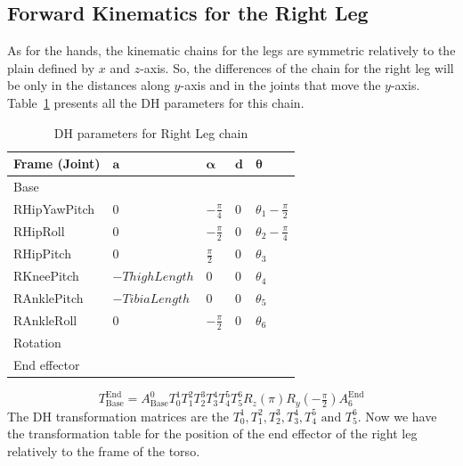 \subsection{Forward Kinematics for the Right Leg}
As for the hands, the kinematic chains for the legs are symmetric relatively to the plain defined by $x$ and $z$-axis. So, the differences of the chain for the right leg will be only in the distances along $y$-axis and in the joints that move the $y$-axis. Table~\ref{tab:DHrleg} presents all the DH parameters for this chain.
\begin{table}[!h]
\centering
\caption{DH parameters for Right Leg chain}
\begin{tabular}{|l|>{\centering\arraybackslash}m{2.55cm}|>{\centering\arraybackslash}m{2.55cm}|>{\centering\arraybackslash}m{2.55cm}|>{\centering\arraybackslash}m{2.55cm}|}
\hline
\textbf{Frame (Joint)} & $\mathbf{a}$ & $\boldsymbol{\alpha}$ & $\mathbf{d}$ & $\boldsymbol{\theta}$\\ \hline
Base & \multicolumn{4}{|c|}{$A(0,\text{\footnotesize{-HipOffsetY}},\text{\footnotesize{-HipOffsetZ}})$} \\ \hline
RHipYawPitch & $0$ & $-\frac{\pi}{4}$ & $0$ & $\theta_1 - \frac{\pi}{2}$ \\ \hline
RHipRoll & $0$ & $-\frac{\pi}{2}$ & $0$ & $\theta_2 - \frac{\pi}{4}$ \\ \hline
RHipPitch & $0$ & $\frac{\pi}{2}$ & $0$ & $\theta_3$ \\ \hline
RKneePitch & $-ThighLength$ & $0$ & $0$ & $\theta_4$ \\ \hline
RAnklePitch & $-TibiaLength$ & $0$ & $0$ & $\theta_5$ \\ \hline
RAnkleRoll & $0$ & $-\frac{\pi}{2}$ & $0$ & $\theta_6$ \\ \hline
Rotation & \multicolumn{4}{c|}{$R_z(\pi)R_y(-\tfrac{\pi}{2})$} \\ \hline
End effector & \multicolumn{4}{c|}{$A(0,0,\text{\footnotesize{-FootHeight}})$} \\ \hline
\end{tabular}
\label{tab:DHrleg}
\end{table}

\[
T^\text{End}_\text{Base} = A^0_\text{Base}T^1_0T^2_1T^3_2T^4_3T^5_4T^6_5R_z(\pi)R_y(-\tfrac{\pi}{2})A^\text{End}_{6}
\]
The DH transformation matrices are the $T^1_0,T^2_1,T^3_2,T^4_3,T^5_4\text{ and }T^6_5$. Now we have the transformation table for the position of the end effector of the right leg relatively to the frame of the torso.

